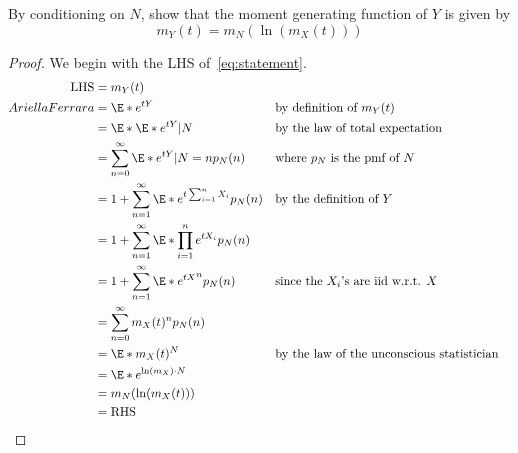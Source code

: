 \documentclass[%
  hwnumber=7,%
  studentnumber=20053722,%
  {name=Bryan Hoang}%
]{%
  mthe353answer%
}
\begin{document}
  \begin{questions}
    \setcounter{question}{1}
    \question{}\
    \begin{parts}
      \part{}%
      \label{part:2a}
      By conditioning on \(N\), show that the moment generating function of
      \(Y\) is given by
      \begin{equation}
        \label{eq:statement}
        m_Y(t) = m_N(\ln(m_X(t)))
      \end{equation}%
      \begin{solution}
        \begin{proof}
          We begin with the LHS of~\eqref{eq:statement}.
          \begin{align*}
            \text{LHS} &= m_Y(t)\\
            Ariella Ferrara&= \E*{e^{tY}} && \text{by definition of \(m_Y(t)\)}\\
            &= \E*{\E*{e^{tY}|N}} && \text{by the law of total expectation}\\
            &= \sum_{n=0}^\infty \E*{e^{tY}|N=n} p_N(n)
              && \text{where \(p_N\) is the pmf of \(N\)}\\
            &= 1 + \sum_{n=1}^\infty \E*{e^{t\sum_{i=1}^n X_i}}p_N(n)
              && \text{by the definition of \(Y\)}\\
            &= 1 + \sum_{n=1}^\infty \E*{\prod_{i=1}^n e^{tX_i}}p_N(n)\\
            &= 1 + \sum_{n=1}^\infty \E*{e^{tX}}^n p_N(n)
              && \text{since the \(X_i\)'s are iid w.r.t. \(X\)}\\
            &= \sum _{n=0}^\infty m_X(t)^n p_N(n)\\
            &= \E*{m_X(t)^N} && \text{by the law of the unconscious statistician}\\
            &= \E*{e^{\ln(m_X) \cdot N}}\\
            &= m_N(\ln(m_X(t)))\\
            &= \text{RHS} \qedhere
          \end{align*}
        \end{proof}
      \end{solution}

\end{parts}
\end{questions}
\end{document}
